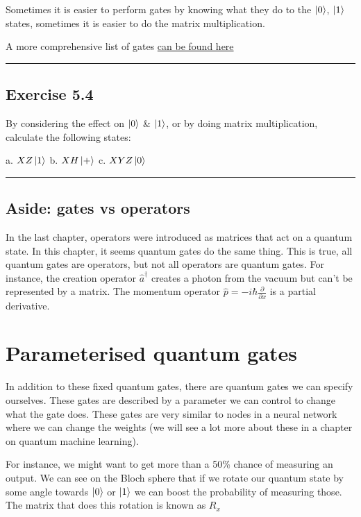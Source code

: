 \documentclass{book}
\begin{document}
Sometimes it is easier to perform gates by knowing what they do to the $\ket{0}$, $\ket{1}$ states, sometimes it is easier to do the matrix multiplication. 

A more comprehensive list of gates \href{https://raw.githubusercontent.com/qiskit-community/qiskit-textbook/main/content/ch-states/supplements/single-gates-cheatsheet.pdf}{can be found here}


\hrule
\subsection{Exercise 5.4}

By considering the effect on $\ket{0}$ \& $ \ket{1}$, or by doing matrix multiplication, calculate the following states:

a. $ XZ\ket{1}$  
b. $ XH\ket{+} $  
c. $ XYZ\ket{0} $
\hrule

\subsection{Aside: gates vs operators}

In the last chapter, operators were introduced as matrices that act on a quantum state. In this chapter, it seems quantum gates do the same thing. This is true, all quantum gates are operators, but not all operators are quantum gates. 
For instance, the creation operator $\hat{a}^\dagger$ creates a photon from the vacuum but can't be represented by a matrix. The momentum operator $\hat{p} = -i\hbar\frac{\partial}{\partial x}$ is a partial derivative. 


\section{Parameterised quantum gates }

In addition to these fixed quantum gates, there are quantum gates we can specify ourselves. These gates are described by a parameter we can control to change what the gate does. These gates are very similar to nodes in a neural network where we can change the weights (we will see a lot more about these in a chapter on quantum machine learning).

For instance, we might want to get more than a 50\% chance of measuring an output. We can see on the Bloch sphere that if we rotate our quantum state by some angle towards $\ket{0}$ or $\ket{1}$ we can boost the probability of measuring those. The matrix that does this rotation is known as $R_x$
\end{document}
